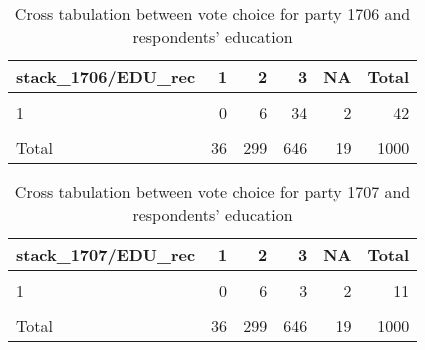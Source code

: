 \documentclass[
]{article}
\begin{document}
\begin{table}

\caption{\label{tab:unnamed-chunk-114}Cross tabulation between vote choice for party 1706 and respondents' education 
                   \label{table:crosstab_1_lt}}
\centering
\begin{tabular}[t]{l|r|r|r|r|r}
\hline
stack\_1706/EDU\_rec & 1 & 2 & 3 & NA & Total\\
\hline
\cellcolor{gray!6}{0} & \cellcolor{gray!6}{29} & \cellcolor{gray!6}{265} & \cellcolor{gray!6}{553} & \cellcolor{gray!6}{14} & \cellcolor{gray!6}{861}\\
\hline
1 & 0 & 6 & 34 & 2 & 42\\
\hline
\cellcolor{gray!6}{NA} & \cellcolor{gray!6}{7} & \cellcolor{gray!6}{28} & \cellcolor{gray!6}{59} & \cellcolor{gray!6}{3} & \cellcolor{gray!6}{97}\\
\hline
Total & 36 & 299 & 646 & 19 & 1000\\
\hline
\end{tabular}
\end{table}

\begin{table}

\caption{\label{tab:unnamed-chunk-114}Cross tabulation between vote choice for party 1707 and respondents' education
                   \label{table:crosstab_2_lt}}
\centering
\begin{tabular}[t]{l|r|r|r|r|r}
\hline
stack\_1707/EDU\_rec & 1 & 2 & 3 & NA & Total\\
\hline
\cellcolor{gray!6}{0} & \cellcolor{gray!6}{29} & \cellcolor{gray!6}{265} & \cellcolor{gray!6}{584} & \cellcolor{gray!6}{14} & \cellcolor{gray!6}{892}\\
\hline
1 & 0 & 6 & 3 & 2 & 11\\
\hline
\cellcolor{gray!6}{NA} & \cellcolor{gray!6}{7} & \cellcolor{gray!6}{28} & \cellcolor{gray!6}{59} & \cellcolor{gray!6}{3} & \cellcolor{gray!6}{97}\\
\hline
Total & 36 & 299 & 646 & 19 & 1000\\
\hline
\end{tabular}
\end{table}
\end{document}
